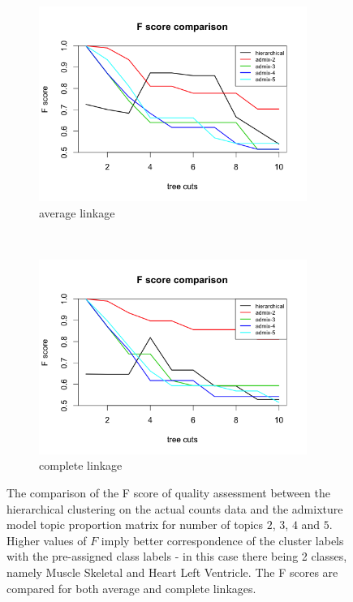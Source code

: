  \begin{figure}[ht]
    \centering
    \begin{subfigure}[t]{0.5\textwidth}
        \centering
        \includegraphics[height=2.5in]{../plots/Fscore_compare_average.png}
        \caption{average linkage}
    \end{subfigure}%
    ~ 
    \begin{subfigure}[t]{0.5\textwidth}
        \centering
        \includegraphics[height=2.5in]{../plots/Fscore_compare_complete.png}
        \caption{complete linkage}
    \end{subfigure} 
 \caption{The comparison of the F score of quality assessment between the hierarchical clustering on the actual counts data and the admixture model topic proportion matrix for number of topics $2$, $3$, $4$ and $5$. Higher values of $F$ imply better correspondence of the cluster labels with the pre-assigned class labels - in this case there being 2 classes, namely Muscle Skeletal and Heart Left Ventricle. The F scores are compared for both average and complete linkages.}
\end{figure}


